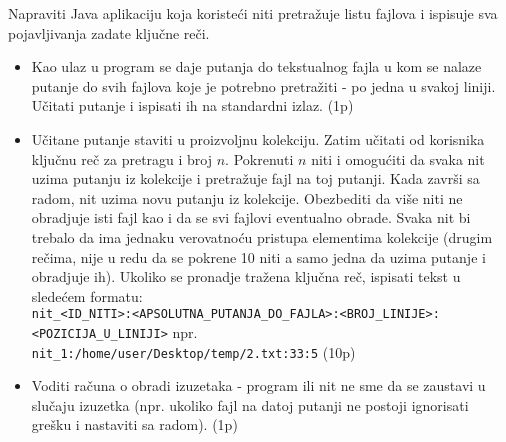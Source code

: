 \documentclass[]{article}
\begin{document}
\begin{enumerate}
  Napraviti Java aplikaciju koja koriste\'c{}i niti pretra\v{z}uje listu fajlova i ispisuje sva pojavljivanja zadate klju\v{c}ne re\v{c}i.
  \begin{itemize}
    \item Kao ulaz u program se daje putanja do tekstualnog fajla u kom se nalaze putanje do svih fajlova koje je potrebno pretra\v{z}iti - po jedna u svakoj liniji. U\v{c}itati putanje i ispisati ih na standardni izlaz. \hfill (1p)
    \item U\v{c}itane putanje staviti u proizvoljnu kolekciju. Zatim u\v{c}itati od korisnika klju\v{c}nu re\v{c} za pretragu i broj $n$. Pokrenuti $n$ niti i omogu\'c{}iti da svaka nit uzima putanju iz kolekcije i pretra\v{z}uje fajl na toj putanji. Kada zavr\v{s}i sa radom, nit uzima novu putanju iz kolekcije. Obezbediti da vi\v{s}e niti ne obradjuje isti fajl kao i da se svi fajlovi eventualno obrade. Svaka nit bi trebalo da ima jednaku verovatno\'c{}u pristupa elementima kolekcije (drugim re\v{c}ima, nije u redu da se pokrene 10 niti a samo jedna da uzima putanje i obradjuje ih). Ukoliko se pronadje tra\v{z}ena klju\v{c}na re\v{c}, ispisati tekst u slede\'c{}em formatu:\\
    \texttt{nit\_<ID\_NITI>:<APSOLUTNA\_PUTANJA\_DO\_FAJLA>:<BROJ\_LINIJE>:<POZICIJA\_U\_LINIJI>} npr.\\
    \texttt{nit\_1:/home/user/Desktop/temp/2.txt:33:5} \hfill (10p)
    \item Voditi ra\v{c}una o obradi izuzetaka - program ili nit ne sme da se zaustavi u slu\v{c}aju izuzetka (npr. ukoliko fajl na datoj putanji ne postoji ignorisati gre\v{s}ku i nastaviti sa radom). \hfill (1p)
  \end{itemize}


\end{enumerate}
\end{document}
